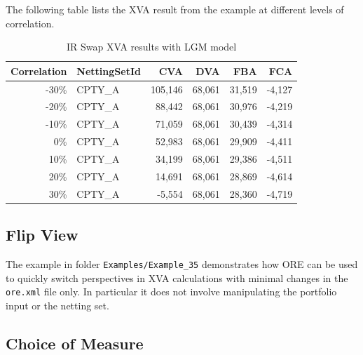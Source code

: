 \documentclass[12pt, a4paper]{article}
\begin{document}
The following table lists the XVA result from the example at different levels of correlation.

\begin{table}[hbt]
\scriptsize
\begin{center}
\begin{tabular}{|r|l|r|r|r|r|}
\hline
Correlation & NettingSetId & CVA & DVA & FBA & FCA \\
\hline
 -30\%  &  CPTY\_A  & 105,146  &  68,061  &  31,519  &  -4,127 \\
 -20\%  &  CPTY\_A  &  88,442  &  68,061  &  30,976  &  -4,219 \\
 -10\%  &  CPTY\_A  &  71,059  &  68,061  &  30,439  &  -4,314 \\
   0\%  &  CPTY\_A  &  52,983  &  68,061  &  29,909  &  -4,411 \\
  10\%  &  CPTY\_A  &  34,199  &  68,061  &  29,386  &  -4,511 \\
  20\%  &  CPTY\_A  &  14,691  &  68,061  &  28,869  &  -4,614 \\
  30\%  &  CPTY\_A  &  -5,554  &  68,061  &  28,360  &  -4,719 \\
\hline
\end{tabular}
\caption{IR Swap XVA results with LGM model}
\end{center}
\end{table}

\subsection{Flip View}%
\label{example:35}

The example in folder {\tt Examples/Example\_35} demonstrates how ORE can be used to quickly switch perspectives in XVA calculations with minimal changes in the {\tt ore.xml} file only. In particular it does not involve manipulating the portfolio input or the netting set.

\subsection{Choice of Measure}%
\label{example:36}
\end{document}
